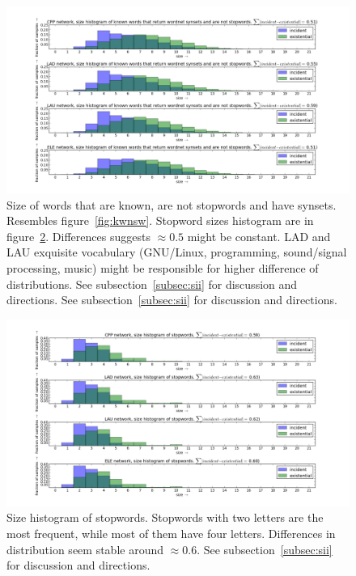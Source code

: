 \documentclass[%
 aip,
 jmp,%
 amsmath,amssymb,
 reprint,%
 floatfix,
]{revtex4-1}
\begin{document}
\begin{figure}[h!]
    \centering
    \includegraphics[width=\textwidth]{figs/kwssnsw}
    \caption{Size of words that are known, are not stopwords and have synsets. Resembles figure~\ref{fig:kwnsw}. Stopword sizes histogram are in figure~\ref{fig:sw}. Differences suggests $\approx 0.5$ might be constant. LAD and LAU exquisite vocabulary (GNU/Linux, programming, sound/signal processing, music) might be responsible for higher difference of distributions. See subsection~\ref{subsec:sii} for discussion and directions. See subsection~\ref{subsec:sii} for discussion and directions.}
    \label{fig:kwssnsw}
\end{figure}


\begin{figure}[h!]
    \centering
    \includegraphics[width=\textwidth]{figs/sw}
    \caption{Size histogram of stopwords. Stopwords with two letters are the most frequent, while most of them have four letters. Differences in distribution seem stable around $\approx 0.6$. See subsection~\ref{subsec:sii} for discussion and directions.}
    \label{fig:sw}
\end{figure}
\end{document}
